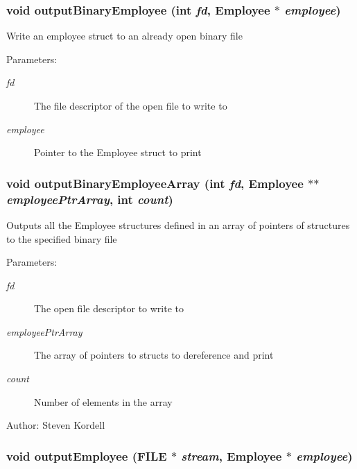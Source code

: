 \subsubsection{\setlength{\rightskip}{0pt plus 5cm}void output\-Binary\-Employee (int {\em fd}, \bf{Employee} $\ast$ {\em employee})}\label{employeef_8c_25cbcfd9c163ee12b69d989599c8f419}


Write an employee struct to an already open binary file \begin{Desc}
\item[Parameters:]
\begin{description}
\item[{\em fd}]The file descriptor of the open file to write to \item[{\em employee}]Pointer to the Employee struct to print \end{description}
\end{Desc}
\subsubsection{\setlength{\rightskip}{0pt plus 5cm}void output\-Binary\-Employee\-Array (int {\em fd}, \bf{Employee} $\ast$$\ast$ {\em employee\-Ptr\-Array}, int {\em count})}\label{employeef_8c_2226d8df976edffea159ac02ed4b1485}


Outputs all the Employee structures defined in an array of pointers of structures to the specified binary file \begin{Desc}
\item[Parameters:]
\begin{description}
\item[{\em fd}]The open file descriptor to write to \item[{\em employee\-Ptr\-Array}]The array of pointers to structs to dereference and print \item[{\em count}]Number of elements in the array \end{description}
\end{Desc}
\begin{Desc}
\item[Author:]Steven Kordell \end{Desc}
\subsubsection{\setlength{\rightskip}{0pt plus 5cm}void output\-Employee (FILE $\ast$ {\em stream}, \bf{Employee} $\ast$ {\em employee})}\label{employeef_8c_fe0dfee3a22cda6855e076582ce67058}



